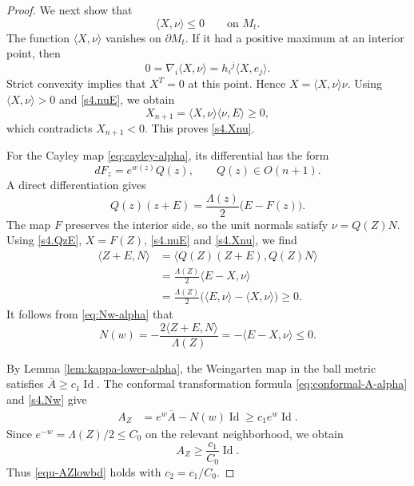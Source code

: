 \documentclass[11pt, reqno]{amsart}
\theoremstyle{remark}
\theoremstyle{definition}
\numberwithin{equation}{section}
\begin{document}
\begin{proof}
We next show that
\begin{equation}\label{s4.Xnu}
 \langle X,\nu\rangle\leq0
 \qquad\text{on }M_t.
\end{equation}
The function $\langle X,\nu\rangle$ vanishes on $\partial M_t$.
If it had a positive maximum at an interior point, then
\begin{equation*}
 0=\nabla_i \langle X,\nu\rangle
   =h_i{}^j\langle X,e_j\rangle.
\end{equation*}
Strict convexity implies that $X^T=0$ at this point. Hence $ X=\langle X,\nu\rangle\nu$.  
Using $\langle X,\nu\rangle>0$ and \eqref{s4.nuE}, we obtain
\begin{equation*}
 X_{n+1}=\langle X,\nu\rangle\langle\nu,E\rangle\geq0,
\end{equation*}
which contradicts $X_{n+1}<0$. This proves \eqref{s4.Xnu}.

For the Cayley map \eqref{eq:cayley-alpha}, its differential has the form
\begin{equation*}
 dF_z=e^{w(z)}Q(z),
 \qquad Q(z)\in O(n+1).
\end{equation*}
A direct differentiation gives
\begin{equation}\label{s4.QzE}
 Q(z)(z+E)
  =
 \frac{\Lambda(z)}{2}\bigl(E-F(z)\bigr).
\end{equation}
The map $F$ preserves the interior side, so the unit normals satisfy $ \nu=Q(Z)N$.  
Using \eqref{s4.QzE}, $X=F(Z)$, \eqref{s4.nuE} and \eqref{s4.Xnu}, we find
\begin{align*}
 \langle Z+E,N\rangle
 &=
 \langle Q(Z)(Z+E),Q(Z)N\rangle \\
 &=
 \frac{\Lambda(Z)}{2}
 \langle E-X,\nu\rangle \\
 &=
 \frac{\Lambda(Z)}{2}
 \bigl(\langle E,\nu\rangle-\langle X,\nu\rangle\bigr)
 \geq0.
\end{align*}
It follows from \eqref{eq:Nw-alpha} that
\begin{equation}\label{s4.Nw}
 N(w)
 =
 -\frac{2\langle Z+E,N\rangle}{\Lambda(Z)}
 =
 -\langle E-X,\nu\rangle
 \leq0.
\end{equation}

By Lemma \ref{lem:kappa-lower-alpha}, the Weingarten map in the ball metric satisfies $\overline A\geq c_1\operatorname{Id}$.  
The conformal transformation formula \eqref{eq:conformal-A-alpha} and \eqref{s4.Nw}
give
\begin{align*}
 A_Z
 &=
 e^w\overline A-N(w)\operatorname{Id}  \geq
 c_1e^w\operatorname{Id}.
\end{align*}
Since $e^{-w}={\Lambda(Z)}/{2}\leq C_0$ 
on the relevant neighborhood, we obtain
\begin{equation*}
 A_Z\geq\frac{c_1}{C_0}\operatorname{Id}.
\end{equation*}
Thus \eqref{equ-AZlowbd} holds with $c_2=c_1/C_0$.
\end{proof}
\end{document}
